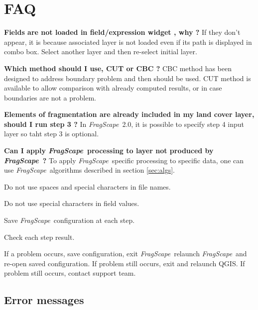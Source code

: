 \documentclass[11pt]{article}
\newcommand{\tool}{\emph{FragScape}}
\let\tempone\itemize
\let\temptwo\enditemize
\renewenvironment{itemize}{\tempone\addtolength{\itemsep}{-0.5\baselineskip}}{\temptwo}
\begin{document}
\section{FAQ}

\begin{itemize}
\item \textbf{Fields are not loaded in field/expression widget , why ?} If they don't appear, it is because associated layer is not loaded even if its path is displayed in combo box. Select another layer and then re-select initial layer.

\item \textbf{Which method should I use, CUT or CBC ?} CBC method has been designed to address boundary problem and then should be used. CUT method is available to allow comparison with already computed results, or in case boundaries are not a problem.

\item \textbf{Elements of fragmentation are already included in my land cover layer, should I run step 3 ?} In \tool\ 2.0, it is possible to specify step 4 input layer so taht step 3 is optional.

\item \textbf{Can I apply \tool\ processing to layer not produced by \tool\ ?} To apply \tool\ specific processing to specific data, one can use \tool\ algorithms described in section \ref{sec:algs}.

\end{itemize}

\begin{itemize}
    \item Do not use spaces and special characters in file names.
    \item Do not use special characters in field values.
    \item Save \tool\ configuration at each step.
    \item Check each step result.
    \item If a problem occurs, save configuration, exit \tool\, relaunch \tool\ and re-open saved configuration. If problem still occurs, exit and relaunch QGIS. If problem still occurs, contact support team.
\end{itemize}
\frameboxend

\subsection{Error messages}
\label{sec:err}
\end{document}
